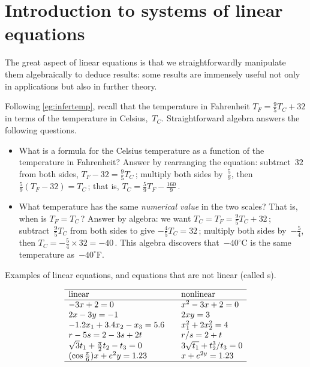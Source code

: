 
\section{Introduction to systems of linear equations}
\label{sec:isle}
{}

\begin{comment}
\pooliv{p.58--64} \layiv{\S1.1} \holti{\S1.1}
\end{comment}


The great aspect of linear equations is that we straightforwardly manipulate them algebraically to deduce results: some results are immensely useful not only in applications but also in further theory.

\begin{example} \label{eg:tempman}
Following \cref{eg:infertemp}, recall that the temperature in Fahrenheit \(T_F=\frac95T_C+32\) in terms of the temperature in Celsius,~\(T_C\).
Straightforward algebra answers the following questions.
\begin{itemize}
\item What is a formula for the Celsius temperature as a function of the temperature in Fahrenheit?  
Answer by rearranging the equation: subtract~\(32\) from both sides, \(T_F-32=\frac95T_C\)\,;  multiply both sides by~\(\frac59\), then \(\frac59(T_F-32)=T_C\)\,; that is, \(T_C=\frac59T_F-\frac{160}9\)\,.

\item What temperature has the same \emph{numerical value} in the two scales?  
That is, when is \(T_F=T_C\)\,?  
Answer by algebra: we want \(T_C=T_F=\frac95T_C+32\)\,; subtract~\(\frac95T_C\) from both sides to give \(-\frac45T_C=32\)\,; multiply both sides by~\(-\frac54\), then \(T_C=-\frac54\times32=-40\)\,. 
This algebra discovers that~\(-40^\circ\)C is the same temperature as~\(-40^\circ\)F.
\aqed
\end{itemize}
\end{example}


\begin{table}[btp]
\caption{Examples of linear equations, and equations that are not linear (called s).}
\label{tbl:linnonlin}
\begin{equation*}
\begin{array}{l@{\qquad}l}\hline
\text{linear}&\text{nonlinear}\\\hline
-3x+2=0 & x^2-3x+2=0 \\
2x-3y=-1 & 2xy=3\\
-1.2x_1+3.4x_2-x_3=5.6 & x_1^2+2x_2^2=4 \\
r-5s=2-3s+2t & r/s=2+t \\
\sqrt3t_1+\frac\pi2t_2-t_3=0 & 3\sqrt{t_1}+t_2^3/t_3=0\\
(\cos\frac\pi6)x+e^2y=1.23 & x+e^{2y}=1.23\\
\hline
\end{array}
\end{equation*}
\end{table}


